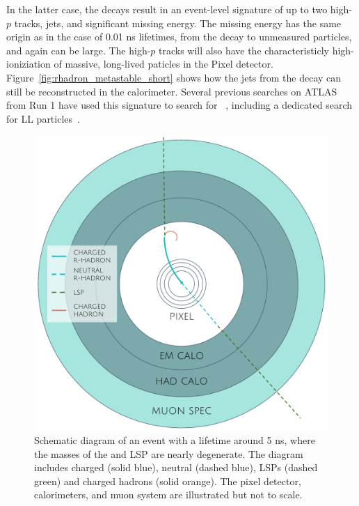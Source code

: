 In the latter case, the decays result in an event-level signature of up to two high-$p$ tracks, jets, and significant missing energy.
The missing energy has the same origin as in the case of 0.01 ns lifetimes, from the decay to unmeasured particles, and again can be large.
The high-$p$ tracks will also have the characteristicly high-ioniziation of massive, long-lived paticles in the Pixel detector.
Figure~\ref{fig:rhadron_metastable_short} shows how the jets from the decay can still be reconstructed in the calorimeter.
Several previous searches on ATLAS from Run 1 have used this signature to search for \rhadrons~\cite{SUSY-2012-01, SUSY-2013-22}, including a dedicated search for \ac{LL} particles~\cite{SUSY-2014-09}.

\begin{figure}[tb]
\centering
\includegraphics[width=\fullfig]{figures/rhadron_disappear.pdf}
\caption{Schematic diagram of an \rhadron event with a lifetime around 5 ns, where the masses of the \rhadron and \acs*{LSP} are nearly degenerate. The diagram includes charged \rhadrons (solid blue), neutral \rhadrons (dashed blue), \acp{LSP} (dashed green) and charged hadrons (solid orange). The pixel detector, calorimeters, and muon system are illustrated but not to scale.}
\label{fig:rhadron_disappear}
\end{figure}

